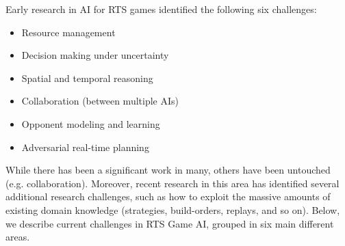 \documentclass[journal]{IEEEtran}
\begin{document}
Early research in AI for RTS games \cite{Buro03rts} identified the following six challenges: 
\begin{itemize}
\item Resource management
\item Decision making under uncertainty
\item Spatial and temporal reasoning
\item Collaboration (between multiple AIs)
\item Opponent modeling and learning
\item Adversarial real-time planning
\end{itemize}

While there has been a significant work in many, others have been untouched (e.g. collaboration). Moreover, recent research in this area has identified several additional research challenges, such as how to exploit the massive amounts of existing domain knowledge (strategies, build-orders, replays, and so on). Below, we describe current challenges in RTS Game AI, grouped in six main different areas.

\end{document}
